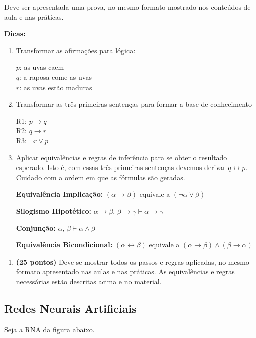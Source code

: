     Deve ser apresentada uma prova, no mesmo formato mostrado nos conteúdos de aula e nas práticas.

    \begin{adjustwidth}{1em}{}
    \textbf{Dicas:}
    \end{adjustwidth}
    \begin{enumerate}[label=\arabic*.]
        \item Transformar as afirmações para lógica:

        $p$: as uvas caem \\
        $q$: a raposa come as uvas \\
        $r$: as uvas estão maduras

        \item Transformar as três primeiras sentenças para formar a base de conhecimento

        R1: $p \rightarrow q$ \\
        R2: $q \rightarrow r$ \\
        R3: $\neg r \vee p$

        \item Aplicar equivalências e regras de inferência para se obter o resultado esperado. Isto é, com essas três primeiras sentenças devemos derivar $q \leftrightarrow p$. Cuidado com a ordem em que as fórmulas são geradas.

        \textbf{Equivalência Implicação:} $(\alpha \rightarrow \beta)$ equivale a $(\neg \alpha \vee \beta)$

        \textbf{Silogismo Hipotético:} $\alpha \rightarrow \beta$, $\beta \rightarrow \gamma \vdash \alpha \rightarrow \gamma$

        \textbf{Conjunção:} $\alpha$, $\beta \vdash \alpha \wedge \beta$

        \textbf{Equivalência Bicondicional:} $(\alpha \leftrightarrow \beta)$ equivale a $(\alpha \rightarrow \beta) \wedge (\beta \rightarrow \alpha)$
    \end{enumerate}

    \begin{enumerate}[label=\alph*)]
        \item \textbf{(25 pontos)} Deve-se mostrar todos os passos e regras aplicadas, no mesmo formato apresentado nas aulas e nas práticas. As equivalências e regras necessárias estão descritas acima e no material.
    \end{enumerate}

\subsection{Redes Neurais Artificiais}
    Seja a RNA da figura abaixo.
    
